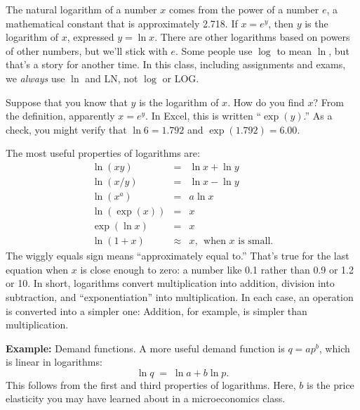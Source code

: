 The natural logarithm of a number $x$ comes from the power of a number $e$,
a mathematical constant that is approximately 2.718.
If $x = e^y$, then $y$ is the logarithm of $x$,
expressed $y = \ln x $.
There are other logarithms based on powers of other numbers,
but we'll stick with $e$.
Some people use $\log$ to mean $\ln$, but that's a story for another time.
In this class, including assignments and exams, we \emph{always} use $\ln$ and LN,
not $\log$ or LOG.


Suppose that you know that $y$ is the logarithm of $x$.
How do you find $x$?  From the definition, apparently $x = e^y$.
In Excel, this is written ``$\exp(y)$.''
As a check, you might verify that $ \ln 6 = 1.792$ and $\exp(1.792) = 6.00$.


The most useful properties of logarithms
 are:
\begin{eqnarray*}
    \ln (xy) &=& \ln x + \ln y  \\
    \ln (x/y) &=& \ln x - \ln y    \\
    \ln (x^a) &=& a \ln x  \\
    \ln (\exp(x)) &=& x \\
    \exp(\ln x) &=& x \\
    \ln (1 + x) &\approx& x, \ \ \mbox{when \ $x$ \ is small}.
\end{eqnarray*}
The wiggly equals sign means ``approximately equal to.''
That's true for the last equation when $x$ is close enough to zero:
a number like 0.1 rather than 0.9 or 1.2 or 10.
In short, logarithms convert multiplication into addition, division into subtraction,
and ``exponentiation'' into multiplication. In each case, an operation is converted into a simpler one:
Addition, for example, is simpler than multiplication.


\textbf{Example:} Demand functions.
A more useful demand function is $ q = a p^b $,
which is linear in logarithms:
\[
    \ln q \;=\; \ln a + b \ln p .
\]
This follows from the first and third properties of logarithms.
Here, $b$ is the price elasticity you may have learned about in a microeconomics class.

